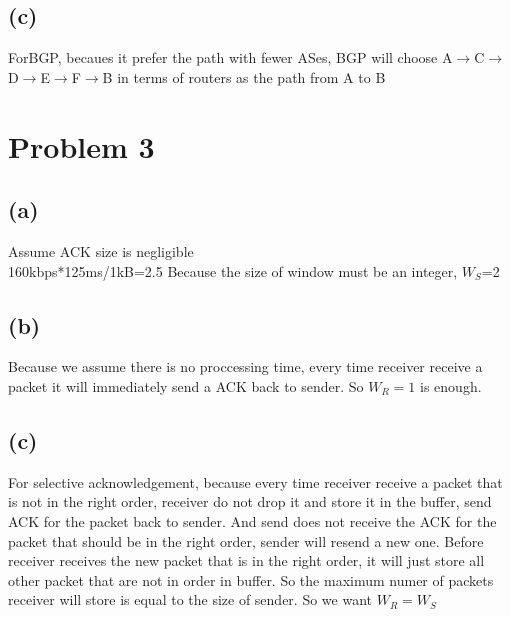 \documentclass[11pt]{article}
\begin{document}
\subsection*{(c)}
ForBGP, becaues it prefer the path with fewer ASes, BGP will choose A$\to$C$\to$D$\to$E$\to$F$\to$B in terms of routers as the path from A to B
\label{pg:end-of-p2}


%



\newpage

\section*{Problem 3}
\subsection*{(a)}
Assume ACK size is negligible\\
160kbps*125ms/1kB=2.5
Because the size of window must be an integer, $W_S$=2
\subsection*{(b)}
Because we assume there is no proccessing time, every time receiver receive a packet it will immediately send a ACK back to sender. So $W_R=1$ is enough.
\subsection*{(c)}
For selective acknowledgement, because every time receiver receive a packet that is not in the right order, receiver do not drop it and store it in the buffer, send ACK for the packet back to sender. And send does not receive the ACK for the packet that should be in the right order, sender will resend a new one. Before receiver receives the new packet that is in the right order, it will just store all other packet that are not in order in buffer. So the maximum numer of packets receiver will store is equal to the size of sender. So we want $W_R=W_S$
\label{pg:end-of-p3}
\end{document}
